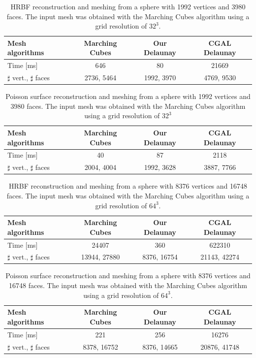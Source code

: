 \documentclass{article}
\begin{document}
\begin{table}
 \caption{HRBF reconstruction and meshing from a sphere with 1992 vertices and 3980 faces. The input mesh was obtained with the Marching Cubes algorithm using a grid resolution of $32^3$.}
\label{hrbf_32}
  \begin{tabular}{|l|c|c|c|} \hline
    Mesh algorithms & Marching Cubes & Our Delaunay & CGAL Delaunay \\  \hline
    Time [ms] & 646 & 80 & 21669\\ \hline
    $\sharp$ vert., $\sharp$ faces & 2736, 5464 & 1992, 3970 &4769, 9530 \\ \hline
  \end{tabular}
\end{table}

\begin{table}
 \caption{Poisson surface reconstruction and meshing from a sphere with 1992 vertices and 3980 faces. The input mesh was obtained with the Marching Cubes algorithm using a grid resolution of $32^3$}
\label{Pois_32}
  \begin{tabular}{|l|c|c|c|} \hline
    Mesh algorithms & Marching Cubes & Our Delaunay & CGAL Delaunay \\  \hline
    Time [ms] & 40 & 87 & 2118\\ \hline
    $\sharp$ vert., $\sharp$ faces & 2004, 4004 & 1992, 3628 &3887, 7766 \\ \hline
  \end{tabular}
\end{table}

\begin{table}
 \caption{HRBF reconstruction and meshing from a sphere with 8376 vertices and 16748 faces. The input mesh was obtained with the Marching Cubes algorithm using a grid resolution of $64^3$.}
\label{hrbf_64}
  \begin{tabular}{|l|c|c|c|} \hline
    Mesh algorithms & Marching Cubes & Our Delaunay & CGAL Delaunay \\  \hline
    Time [ms] & 24407 & 360 & 622310\\ \hline
    $\sharp$ vert., $\sharp$ faces & 13944, 27880 & 8376, 16754 &21143, 42274 \\ \hline
  \end{tabular}
\end{table}

\begin{table}
 \caption{Poisson surface reconstruction and meshing from a sphere with 8376 vertices and 16748 faces. The input mesh was obtained with the Marching Cubes algorithm using a grid resolution of $64^3$.}
\label{Pois_64}
  \begin{tabular}{|l|c|c|c|} \hline
    Mesh algorithms & Marching Cubes & Our Delaunay & CGAL Delaunay \\  \hline
    Time [ms] & 221 & 256 & 16276\\ \hline
    $\sharp$ vert., $\sharp$ faces & 8378, 16752 & 8376, 14665 &20876, 41748 \\ \hline
  \end{tabular}
\end{table}
\end{document}
